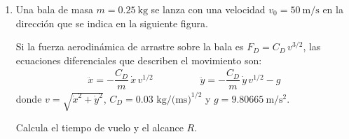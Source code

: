 \documentclass[hidelinks,12pt]{article}
\newcommand{\pderivada}[1]{\ensuremath{{#1}^{\prime}}}
\newcommand{\sderivada}[1]{\ensuremath{{#1}^{\prime \prime}}}
\begin{document}
\begin{enumerate}
\item Una bala de masa $m = \SI{0.25}{\kilo\gram}$ se lanza con una velocidad $v_{0} = \SI{50}{\meter\per\second}$ en la dirección que se indica en la siguiente figura.
\begin{figure}[H]
\centering
{}
\end{figure}
Si la fuerza aerodinámica de arrastre sobre la bala es $F_{D}= C_{D} \, v^{3/2}$, las ecuaciones diferenciales que describen el movimiento son:
\begin{align*}
\ddot{x} = - \dfrac{C_{D}}{m} \, \dot{x} \, v^{1/2} \hspace{2cm} \ddot{y}= - \dfrac{C_{D}}{m} \, \dot{y} \, v^{1/2} - g
\end{align*}
donde $v = \sqrt{\dot{x}^{2} + \dot{y}^{2}}$, $C_{D} = 0.03 \mbox{ kg/(ms)}^{1/2}$ y $g = \SI{9.80665}{\meter\per\square\second}$.

Calcula el tiempo de vuelo y el alcance $R$.



\end{enumerate}
\end{document}
